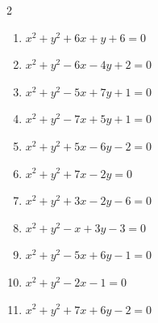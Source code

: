 \begin{multicols}{2}
\begin{enumerate}
  \item $x^{2}+y^{2}+6x+y+6=0$


  \item $x^{2}+y^{2}-6x-4y+2=0$


  \item $x^{2}+y^{2}-5x+7y+1=0$


  \item $x^{2}+y^{2}-7x+5y+1=0$


  \item $x^{2}+y^{2}+5x-6y-2=0$


  \item $x^{2}+y^{2}+7x-2y=0$


  \item $x^{2}+y^{2}+3x-2y-6=0$


  \item $x^{2}+y^{2}-x+3y-3=0$


  \item $x^{2}+y^{2}-5x+6y-1=0$


  \item $x^{2}+y^{2}-2x-1=0$


  \item $x^{2}+y^{2}+7x+6y-2=0$


\end{enumerate}
\end{multicols}
